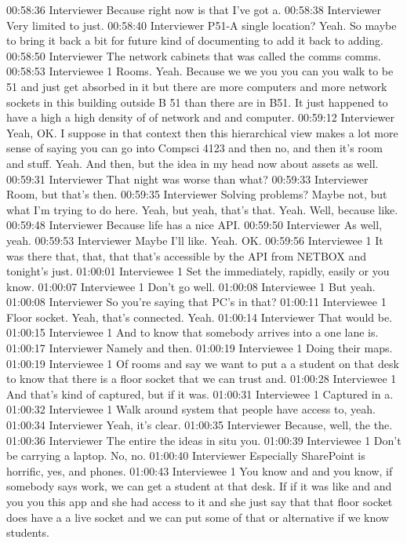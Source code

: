 00:58:36 Interviewer
Because right now is that I've got a.
00:58:38 Interviewer
Very limited to just.
00:58:40 Interviewer
P51-A single location? Yeah. So maybe to bring it back a bit for future kind of documenting to add it back to adding.
00:58:50 Interviewer
The network cabinets that was called the comms comms.
00:58:53 Interviewee 1
Rooms. Yeah. Because we we you you can you walk to be 51 and just get absorbed in it but there are more computers and more network sockets in this building outside B 51 than there are in B51. It just happened to have a high a high density of of network and and computer.
00:59:12 Interviewer
Yeah, OK. I suppose in that context then this hierarchical view makes a lot more sense of saying you can go into Compsci 4123 and then no, and then it's room and stuff. Yeah. And then, but the idea in my head now about assets as well.
00:59:31 Interviewer
That night was worse than what?
00:59:33 Interviewer
Room, but that's then.
00:59:35 Interviewer
Solving problems? Maybe not, but what I'm trying to do here. Yeah, but yeah, that's that. Yeah. Well, because like.
00:59:48 Interviewer
Because life has a nice API.
00:59:50 Interviewer
As well, yeah.
00:59:53 Interviewer
Maybe I'll like. Yeah. OK.
00:59:56 Interviewee 1
It was there that, that, that that's accessible by the API from NETBOX and tonight's just.
01:00:01 Interviewee 1
Set the immediately, rapidly, easily or you know.
01:00:07 Interviewee 1
Don't go well.
01:00:08 Interviewee 1
But yeah.
01:00:08 Interviewer
So you're saying that PC's in that?
01:00:11 Interviewee 1
Floor socket. Yeah, that's connected. Yeah.
01:00:14 Interviewer
That would be.
01:00:15 Interviewee 1
And to know that somebody arrives into a one lane is.
01:00:17 Interviewer
Namely and then.
01:00:19 Interviewee 1
Doing their maps.
01:00:19 Interviewee 1
Of rooms and say we want to put a a student on that desk to know that there is a floor socket that we can trust and.
01:00:28 Interviewee 1
And that's kind of captured, but if it was.
01:00:31 Interviewee 1
Captured in a.
01:00:32 Interviewee 1
Walk around system that people have access to, yeah.
01:00:34 Interviewer
Yeah, it's clear.
01:00:35 Interviewer
Because, well, the the.
01:00:36 Interviewer
The entire the ideas in situ you.
01:00:39 Interviewee 1
Don't be carrying a laptop. No, no.
01:00:40 Interviewer
Especially SharePoint is horrific, yes, and phones.
01:00:43 Interviewee 1
You know and and you know, if somebody says work, we can get a student at that desk. If if it was like and and you you this app and she had access to it and she just say that that floor socket does have a a live socket and we can put some of that or alternative if we know students.
